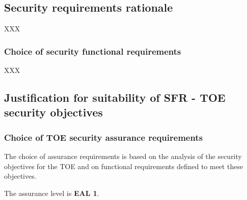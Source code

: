 \documentclass[10pt,a4paper,english]{article}
\begin{document}

\hypertarget{security-requirements-rationale}{}
\subsection*{Security requirements rationale}

XXX



\hypertarget{choice-of-security-functional-requirements}{}
\subsubsection*{Choice of security functional requirements}

XXX



\hypertarget{justification-for-suitability-of-sfr-toe-security-objectives}{}
\subsection*{Justification for suitability of SFR - TOE security objectives}



\hypertarget{choice-of-toe-security-assurance-requirements}{}
\subsubsection*{Choice of TOE security assurance requirements}

The choice of assurance requirements is based on the analysis of the security
objectives for the TOE and on functional requirements defined to meet these
objectives.

The assurance level is \textbf{EAL 1}.


\end{document}
